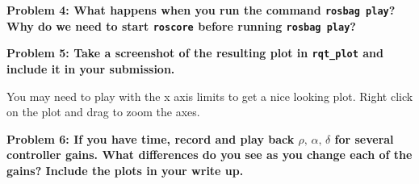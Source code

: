 \documentclass{article}
\begin{document}
\textbf{Problem 4: What happens when you run the command \texttt{rosbag play}? Why do we need to start \texttt{roscore} before running \texttt{rosbag play}?}

\textbf{Problem 5: Take a screenshot of the resulting plot in \texttt{rqt\_plot} and include it in your submission.}

You may need to play with the x axis limits to get a nice looking plot. Right click on the plot and drag to zoom the axes.

\textbf{Problem 6: If you have time, record and play back $\rho, \, \alpha, \, \delta$ for several controller gains. What differences do you see as you change each of the gains? Include the plots in your write up.}
\end{document}
